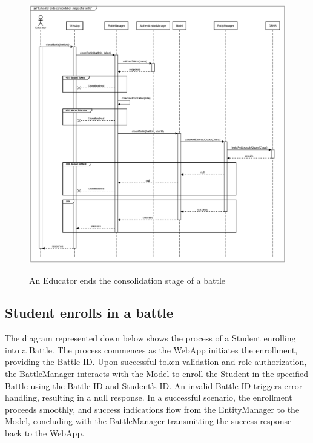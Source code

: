 \documentclass{Configuration_Files/Template}
\begin{document}
\begin{figure}[H]
\centering
\includegraphics[scale = 0.33]{Images/diagrams/sequences/endBattle.png}\\
\caption{An Educator ends the consolidation stage of a battle}
\end{figure}

\subsection{Student enrolls in a battle}

The diagram represented down below shows the process of a Student enrolling into a Battle. The process commences as the WebApp initiates the enrollment, providing the Battle ID. Upon successful token validation and role authorization, the BattleManager interacts with the Model to enroll the Student in the specified Battle using the Battle ID and Student's ID. An invalid Battle ID triggers error handling, resulting in a null response. In a successful scenario, the enrollment proceeds smoothly, and success indications flow from the EntityManager to the Model, concluding with the BattleManager transmitting the success response back to the WebApp.
\end{document}
